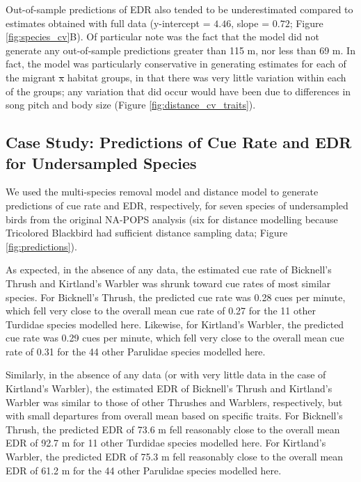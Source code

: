 \documentclass[12pt]{article}
\makeatletter
\providecommand{\DIFadd}[1]{{\protect\color{blue}\uwave{#1}}} %
\providecommand{\DIFdel}[1]{{\protect\color{red}\sout{#1}}} %
\providecommand{\DIFaddbegin}{} %
\providecommand{\DIFaddend}{} %
\providecommand{\DIFdelbegin}{} %
\providecommand{\DIFdelend}{} %
\newcommand{\DIFscaledelfig}{0.5}
\newlength{\DIFdelgraphicswidth} %
\newlength{\DIFdelgraphicsheight} %
\newcommand{\DIFaddincludegraphics}[2][]{{\color{blue}\fbox{\DIFOincludegraphics[#1]{#2}}}} %
\newcommand{\DIFdelincludegraphics}[2][]{%
\sbox{\DIFdelgraphicsbox}{\DIFOincludegraphics[#1]{#2}}%
\settoboxwidth{\DIFdelgraphicswidth}{\DIFdelgraphicsbox} %
\settoboxtotalheight{\DIFdelgraphicsheight}{\DIFdelgraphicsbox} %
\scalebox{\DIFscaledelfig}{%
\parbox[b]{\DIFdelgraphicswidth}{\usebox{\DIFdelgraphicsbox}\\[-\baselineskip] \rule{\DIFdelgraphicswidth}{0em}}\llap{\resizebox{\DIFdelgraphicswidth}{\DIFdelgraphicsheight}{%
\setlength{\unitlength}{\DIFdelgraphicswidth}%
\begin{picture}(1,1)%
\thicklines\linethickness{2pt} %
{\color[rgb]{1,0,0}\put(0,0){\framebox(1,1){}}}%
{\color[rgb]{1,0,0}\put(0,0){\line( 1,1){1}}}%
{\color[rgb]{1,0,0}\put(0,1){\line(1,-1){1}}}%
\end{picture}%
}\hspace*{3pt}}} %
} %
\DeclareRobustCommand{\DIFaddbegin}{\DIFOaddbegin \let\includegraphics\DIFaddincludegraphics} %
\DeclareRobustCommand{\DIFaddend}{\DIFOaddend \let\includegraphics\DIFOincludegraphics} %
\DeclareRobustCommand{\DIFdelbegin}{\DIFOdelbegin \let\includegraphics\DIFdelincludegraphics} %
\DeclareRobustCommand{\DIFdelend}{\DIFOaddend \let\includegraphics\DIFOincludegraphics} %
\let\sout@orig\sout %
\renewcommand{\sout}[1]{\ifmmode\text{\sout@orig{\ensuremath{#1}}}\else\sout@orig{#1}\fi} %
\makeatother
\begin{document}
\par Out-of-sample predictions of EDR also tended to be underestimated compared to estimates obtained with full data (y-intercept = $4.46$, slope = $0.72$; Figure \ref{fig:species_cv}B).
Of particular note was the fact that the model did not generate any out-of-sample predictions greater than 115 m, nor less than 69 m.
In fact, the model was particularly conservative in generating estimates for each of the migrant \DIFdelbegin \DIFdel{x }\DIFdelend \DIFaddbegin \DIFadd{$\times$ }\DIFaddend habitat groups, in that there was very little variation within each of the groups; any variation that did occur would have been due to differences in song pitch and body size (Figure \ref{fig:distance_cv_traits}).

\subsection{Case Study: Predictions of Cue Rate and EDR for Undersampled Species}

\par We used the multi-species removal model and distance model to generate predictions of cue rate and EDR, respectively, for seven species of undersampled birds from the original NA-POPS analysis (six for distance modelling because Tricolored Blackbird had sufficient distance sampling data; Figure \ref{fig:predictions}).

\par As expected, in the absence of any data, the estimated cue rate of Bicknell’s Thrush and Kirtland’s Warbler was shrunk toward cue rates of most similar species.
For Bicknell's Thrush, the predicted cue rate was 0.28 cues per minute, which fell very close to the overall mean cue rate of 0.27 for the 11 other Turdidae species modelled here.
Likewise, for Kirtland's Warbler, the predicted cue rate was 0.29 cues per minute, which fell very close to the overall mean cue rate of 0.31 for the 44 other Parulidae species modelled here.

\par Similarly, in the absence of any data (or with very little data in the case of Kirtland’s Warbler), the estimated EDR of Bicknell’s Thrush and Kirtland’s Warbler was similar to those of other Thrushes and Warblers, respectively, but with small departures from overall mean based on specific traits.
For Bicknell's Thrush, the predicted EDR of 73.6 m fell reasonably close to the overall mean EDR of 92.7 m for 11 other Turdidae species modelled here.
For Kirtland's Warbler, the predicted EDR of 75.3 m fell reasonably close to the overall mean EDR of 61.2 m for the 44 other Parulidae species modelled here.
\end{document}
